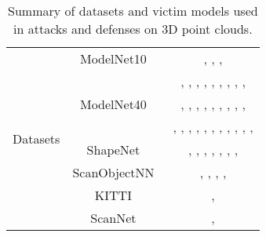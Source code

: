 \documentclass{ieeeaccess}
\begin{document}
\begin{table*}
\begin{center}
\caption{Summary of datasets and victim models used in attacks and defenses on 3D point clouds.}
\label{tab_Bechmark} 
\begin{tabular}{ c|c|c} 
\hline

\multirow{9}{*}{Datasets}
& \multirow{1}{*}{ModelNet10~\cite{wu20153d}} & \cite{wicker2019robustness}, \cite{sun2020adversarial}, \cite{sun2021improving}, \cite{zhao2020nudge}\\
\cline{2-3}
& \multirow{3}{*}{ModelNet40~\cite{wu20153d}} & \cite{liu2019extending}, \cite{wicker2019robustness}, \cite{liu2022imperceptible}, \cite{kim2021minimal}, \cite{liu2020adversarial}, \cite{arya2021adversarial}, \cite{tsai2020robust}, \cite{zhou2020lg}, \cite{wen2020geometry}, \cite{zheng2019pointcloud}\\ && \cite{xiang2019generating}, \cite{wu2020if}, \cite{huang2022shape}, \cite{tang2022rethinking}, \cite{liang2022pagn}, \cite{denipitiyage2021provable}, \cite{sun2020adversarial}, \cite{sun2021local}, \cite{sun2021improving}, \cite{zhang20233d}\\ && \cite{lee2020shapeadv}, \cite{dong2020self}, \cite{zhao2020nudge}, \cite{zhao2020isometry}, \cite{ma2020efficient}, \cite{zhou2019dup}, \cite{ma2021towards}, \cite{li2022robust}, \cite{miao2022isometric}, \cite{liu2022point}, \cite{Shi2022Shape}, \cite{he2023point}\\
\cline{2-3}
&\multirow{1}{*}{ShapeNet~\cite{chang2015shapenet}} & \cite{arya2021adversarial}, \cite{zhou2020lg}, \cite{hamdi2020advpc}, \cite{wu2020if}, \cite{tang2022rethinking}, \cite{zhao2020isometry}, \cite{lang2021geometric}, \cite{zhang2019defense}\\
\cline{2-3}
& \multirow{1}{*}{ScanObjectNN~\cite{uy2019revisiting}} & \cite{kim2021minimal}, \cite{denipitiyage2021provable}, \cite{liu2021pointguard}, \cite{sun2020adversarial}, \cite{sun2021improving} \\
\cline{2-3}

& \multirow{1}{*}{KITTI~\cite{geiger2012we}} & \cite{wicker2019robustness}, \cite{cheng2021universal} \\
\cline{2-3}

& \multirow{1}{*}{ScanNet~\cite{qi2017pointnet}} & \cite{liu2021pointguard}, \cite{li2022robust}  \\
\cline{2-3}



\end{tabular}
\end{center}
\end{table*}
\end{document}
